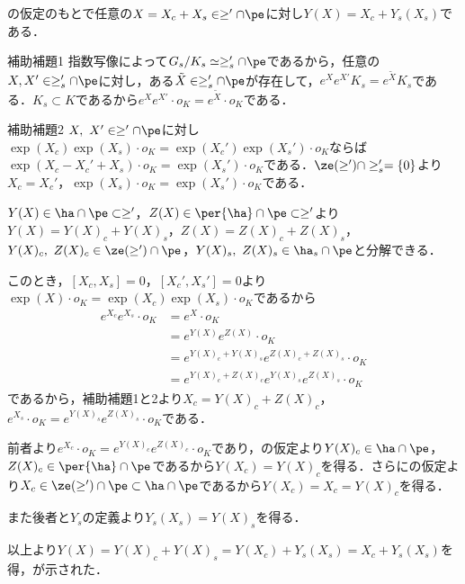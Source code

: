 \begin{lem}\label{lem:0117-decomp}
  の仮定のもとで任意の$X = X_c + X_s \in \ge'\cap\pe $に対し$Y(X) = X_c + Y_s(X_s) $である．
\end{lem}
\begin{npfwn}

  \leavevmode
  \begin{itembox}[l]{補助補題1}
    指数写像によって$G_s/K_s \simeq \ge_s'\cap \pe $であるから，任意の$X, X'\in \ge_{s}'\cap \pe $に対し，ある$\tilde{X}\in \ge_s'\cap \pe$が存在して，$e^{X}e^{X'}K_s = e^{\tilde{X}}K_s  $である．$K_s\subset K $であるから$e^{X}e^{X'}\cdot o_K = e^{\tilde{X}}\cdot o_K $である．
  \end{itembox}
  
  
  \begin{itembox}[l]{補助補題2}
    $X,\ X'\in \ge'\cap\pe $に対し$\exp(X_c)\exp(X_s)\cdot o_K = \exp(X_c')\exp(X_s')\cdot o_K $ならば$\exp(X_c-X_c'+X_s)\cdot o_K = \exp(X_s')\cdot o_K $である．$\ze(\ge')\cap \ge_s' = \{0\} $より$X_c = X_c' $，$\exp(X_s)\cdot o_K = \exp(X_s')\cdot o_K$である．
  \end{itembox}
  
  $Y(X)\in \ha\cap\pe\subset \ge' $，$Z(X)\in \per{\ha}\cap\pe\subset \ge' $より$Y(X) = Y(X)_c + Y(X)_s $，$Z(X) = Z(X)_c + Z(X)_s $，$Y(X)_c,\ Z(X)_c \in \ze(\ge')\cap\pe  $，$Y(X)_s,\ Z(X)_s\in \ha_s\cap\pe $と分解できる．

  このとき，$[X_c, X_s] = 0 $，$[X_c', X_s'] = 0$より$\exp(X)\cdot o_K = \exp(X_c)\exp(X_s)\cdot o_K $であるから
  \begin{align*}
    e^{X_c}e^{X_s}\cdot o_K &= e^{X}\cdot o_K \\
                            &= e^{Y(X)}e^{Z(X)}\cdot o_K\\
                            &= e^{Y(X)_c + Y(X)_s}e^{Z(X)_c + Z(X)_s}\cdot o_K\\
                            &= e^{Y(X)_c + Z(X)_c}e^{Y(X)_s}e^{Z(X)_s}\cdot o_K
  \end{align*}
  であるから，補助補題1と2より$X_c = Y(X)_c + Z(X)_c $，$e^{X_s}\cdot o_K = e^{Y(X)_s}e^{Z(X)_s}\cdot o_K $である．

  前者より$e^{X_c} \cdot o_K = e^{Y(X)_c}e^{Z(X)_c}\cdot o_K $であり，の仮定より$Y(X)_c \in \ha\cap \pe$，$  Z(X)_c \in \per{\ha}\cap \pe$であるから$Y(X_c) = Y(X)_c $を得る．さらにの仮定より$X_c\in \ze(\ge')\cap \pe\subset \ha \cap \pe $であるから$Y(X_c) = X_c = Y(X)_c $を得る．

  また後者と$Y_s$の定義より$Y_s(X_s) = Y(X)_s $を得る．

  以上より$Y(X) = Y(X)_c + Y(X)_s = Y(X_c) + Y_s(X_s) = X_c + Y_s(X_s) $を得，が示された．
\end{npfwn}

